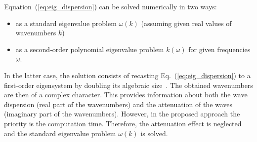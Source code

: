\documentclass[preprint,12pt]{elsarticle}
\begin{document}
Equation~(\ref{eq:eig_dispersion}) can be solved numerically in two ways:
	\begin{itemize}
		\item as a standard eigenvalue problem \(\omega (k)\) (assuming given real values of wavenumbers \(k\))
		\item as a second-order polynomial eigenvalue problem \(k(\omega)\) for given frequencies \(\omega\).
	\end{itemize}
In the latter case, the solution consists of recasting Eq.~(\ref{eq:eig_dispersion}) to a first-order eigensystem by doubling its algebraic size~\cite{Bartoli2006}. 
The obtained wavenumbers are then of a complex character. 
This provides information about both the wave dispersion (real part of the wavenumbers) and the attenuation of the waves (imaginary part of the wavenumbers).  
However, in the proposed approach the priority is the computation time.
Therefore, the attenuation effect is neglected and the standard eigenvalue problem \(\omega (k)\) is solved.
\end{document}
